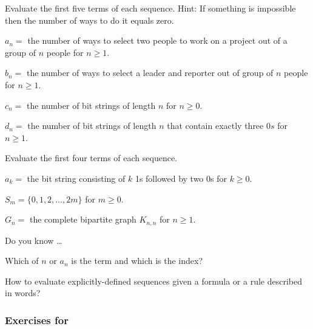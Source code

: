\begin{exer}[\exerU] %
\label{exer_eval_seq_counting} 
    Evaluate the first five terms of each sequence.  Hint: If something is impossible then the number of ways to do it equals zero.
    \begin{exerpart}
        \item $a_n = $ the number of ways to select two people to work on a project out of a group of $n$ people for $n \ge 1$. 
        \item $b_n=$ the number of ways to select a leader and reporter out of group of $n$ people for $n \ge 1$.
        \item $c_n=$ the number of bit strings of length $n$ for $n \ge 0$.
        \item $d_n=$ the number of bit strings of length $n$ that contain exactly three $0s$ for $n \ge 1$.  
    \end{exerpart}
\end{exer}

\begin{exer}[\exerU] %
\label{exer_eval_seq_discrete}
    Evaluate the first four terms of each sequence.
        \begin{exerpart}
            \item $a_k =$ the bit string consisting of $k$ 1s followed by two 0s for $k \ge 0$.
            \item $S_m = \{ 0, 1, 2, \ldots, 2m\}$  for $m\ge 0$.
            \item $G_n =$ the complete bipartite graph $K_{n,n}$ for $n \ge 1$.
        \end{exerpart}  
\end{exer}

\begin{exer}[\exerR] %
\label{exer_dyk_explicit_seq}
    Do you know \ldots
        \begin{exerpart}
            \item Which of $n$ or $a_n$ is the term and which is the index?
            \item How to evaluate explicitly-defined sequences given a formula or a rule described in words?
        \end{exerpart}
\end{exer}


\subsubsection*{Exercises for  \submodelseq}

